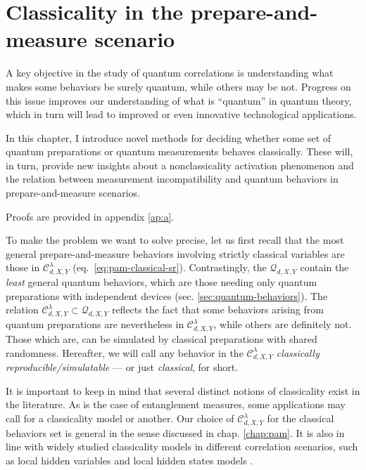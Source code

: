 \chapter{Classicality in the prepare-and-measure scenario}
\label{chap:pam-classical}

    A key objective in the study of quantum correlations is understanding what makes some behaviors be surely quantum, while others may be not. Progress on this issue improves our understanding of what is ``quantum'' in quantum theory, which in turn will lead to improved or even innovative technological applications.

    In this chapter, I introduce novel methods for deciding whether some set of quantum preparations or quantum measurements behaves classically. These will, in turn, provide new insights about a nonclassicality activation phenomenon and the relation between measurement incompatibility and quantum behaviors in prepare-and-measure scenarios.

    Proofs are provided in appendix \ref{ap:a}.

    \ornamentbreak

    To make the problem we want to solve precise, let us first recall that  the most general prepare-and-measure behaviors involving strictly classical variables are those in $\mathcal{C}^\lambda_{d,X,Y}$ (eq.~\eqref{eq:pam-classical-sr}).  Contrastingly, the $\mathcal{Q}_{d,X,Y}$ contain the \emph{least} general quantum behaviors, which are those needing only quantum preparations with independent devices (sec. \ref{sec:quantum-behaviors}). The relation $\mathcal{C}_{d,X,Y}^\lambda \subset \mathcal{Q}_{d,X,Y}$  reflects the fact that some behaviors arising from quantum preparations are nevertheless in $\mathcal{C}_{d,X,Y}^\lambda$, while others are definitely not. Those which are, can be simulated by classical preparations with shared randomness. Hereafter, we will call any behavior in the $\mathcal{C}^\lambda_{d,X,Y}$ \emph{classically reproducible/simulatable} --- or just \emph{classical}, for short.

    It is important to keep in mind that several distinct notions of classicality exist in the literature. As is the case of entanglement measures, some applications may call for a classicality model or another. Our choice of $\mathcal{C}_{d,X,Y}^\lambda$ for the classical behaviors set is general in the sense discussed in chap. \ref{chap:pam}. It is also in line with widely studied classicality models in different correlation scenarios, such as local hidden variables and local hidden states models \cite{brunner_2014_nonlocality,uola_2020_steering,cavalcanti_2016_steering}.

